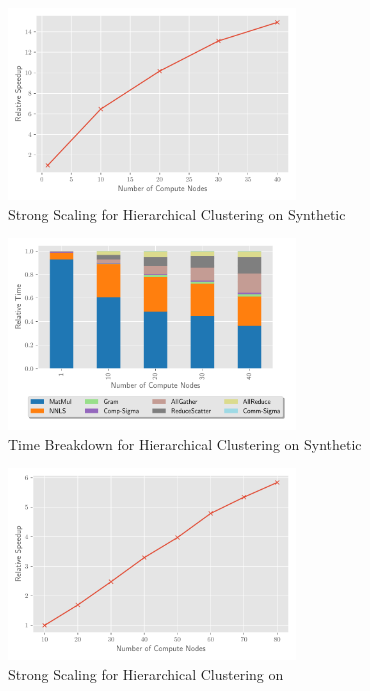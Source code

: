 \begin{figure}
\begin{center}
\includegraphics[height=2in, width=\columnwidth]{plots/synthetic_hierarchical_speedup.pdf}
\caption{Strong Scaling for Hierarchical Clustering on Synthetic}
\label{fig:synhierspeedup}
\end{center}
\end{figure}

\begin{figure}
\begin{center}
\includegraphics[height=2in, width=\columnwidth]{plots/synthetic_hier_strongscaling.pdf}
\caption{Time Breakdown for Hierarchical Clustering on Synthetic}
\label{fig:synhierstrongscaling}
\end{center}
\end{figure}

\begin{figure}
\begin{center}
\includegraphics[height=2in, width=\columnwidth]{plots/realworld_hierarchical_speedup.pdf}
\caption{Strong Scaling for Hierarchical Clustering on \image{}}
\label{fig:rwhierspeedup}
\end{center}
\end{figure}

